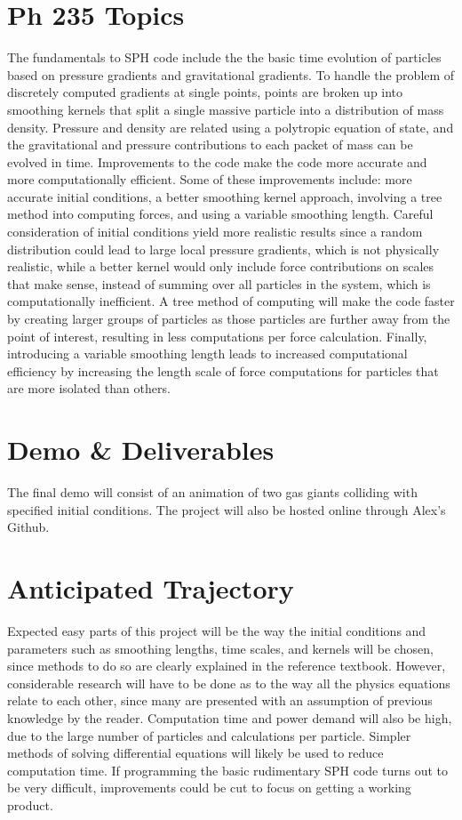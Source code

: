 \documentclass[12pt]{article}
\begin{document}
\section{Ph 235 Topics}
The fundamentals to SPH code include the the basic time evolution of particles based on pressure gradients and gravitational gradients. To handle the problem of discretely computed gradients at single points, points are broken up into smoothing kernels that split a single massive particle into a distribution of mass density. Pressure and density are related using a polytropic equation of state, and the gravitational and pressure contributions to each packet of mass can be evolved in time. Improvements to the code make the code more accurate and more computationally efficient. Some of these improvements include: more accurate initial conditions, a better smoothing kernel approach, involving a tree method into computing forces, and using a variable smoothing length. Careful consideration of initial conditions yield more realistic results since a random distribution could lead to large local pressure gradients, which is not physically realistic, while a better kernel would only include force contributions on scales that make sense, instead of summing over all particles in the system, which is computationally inefficient. A tree method of computing will make the code faster by creating larger groups of particles as those particles are further away from the point of interest, resulting in less computations per force calculation. Finally, introducing a variable smoothing length leads to increased computational efficiency by increasing the length scale of force computations for particles that are more isolated than others.


\section{Demo \& Deliverables}
The final demo will consist of an animation of two gas giants colliding with specified initial conditions. The project will also be hosted online through Alex's Github. 

\section{Anticipated Trajectory}
Expected easy parts of this project will be the way the initial conditions and parameters such as smoothing lengths, time scales, and kernels will be chosen, since methods to do so are clearly explained in the reference textbook. However, considerable research will have to be done as to the way all the physics equations relate to each other, since many are presented with an assumption of previous knowledge by the reader. Computation time and power demand will also be high, due to the large number of particles and calculations per particle. Simpler methods of solving differential equations will likely be used to reduce computation time. If programming the basic rudimentary SPH code turns out to be very difficult, improvements could be cut to focus on getting a working product.
\end{document}
